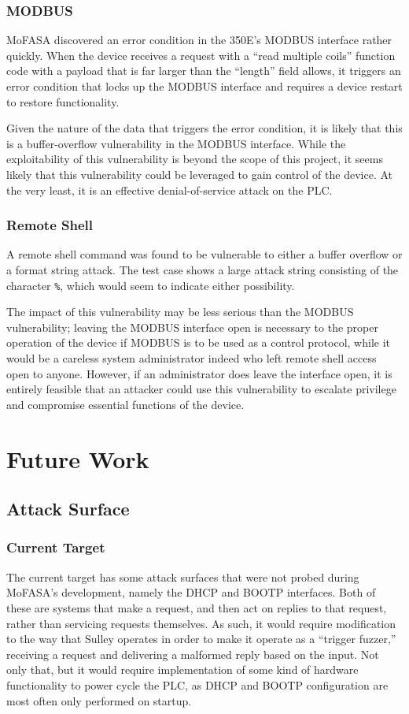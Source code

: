 \documentclass{report}
\begin{document}
\subsection{MODBUS}

MoFASA discovered an error condition in the 350E's MODBUS interface rather quickly. When the device receives a request with a ``read multiple coils''
function code with a payload that is far larger than the ``length'' field allows, it triggers an error condition that locks up the MODBUS interface
and requires a device restart to restore functionality. 

Given the nature of the data that triggers the error condition, it is likely that this is a buffer-overflow vulnerability in the MODBUS interface.
While the exploitability of this vulnerability is beyond the scope of this project, it seems likely that this vulnerability could be leveraged
to gain control of the device. At the very least, it is an effective denial-of-service attack on the PLC.

\subsection{Remote Shell}

A remote shell command was found to be vulnerable to either a buffer overflow or a format string attack. The test case shows a large attack string consisting
of the character \texttt{\%}, which would seem to indicate either possibility.

The impact of this vulnerability may be less serious than the MODBUS vulnerability; leaving the MODBUS interface open is necessary to the proper operation of
the device if MODBUS is to be used as a control protocol, while it would be a careless system administrator indeed who left remote shell access open to anyone.
However, if an administrator does leave the interface open, it is entirely feasible that an attacker could use this vulnerability to escalate privilege and
compromise essential functions of the device.



\chapter{Future Work}
\section{Attack Surface}
\subsection{Current Target}
The current target has some attack surfaces that were not probed during MoFASA's development, namely the DHCP and BOOTP interfaces.
Both of these are systems that make a request, and then act on replies to that request, rather than servicing requests themselves.
As such, it would require modification to the way that Sulley operates in order to make it operate as a ``trigger fuzzer,'' receiving
a request and delivering a malformed reply based on the input. Not only that, but it would require implementation of some kind of hardware
functionality to power cycle the PLC, as DHCP and BOOTP configuration are most often only performed on startup.
\end{document}
